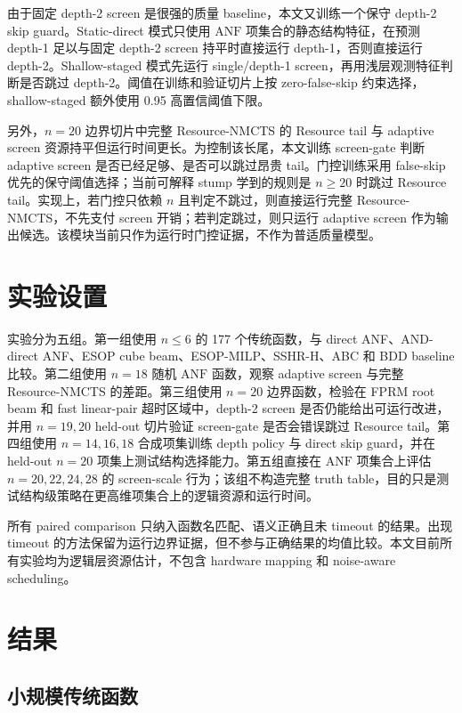 \documentclass[UTF8,fontset=macnew,11pt]{ctexart}
\newcommand{\method}{Resource-NMCTS}
\newcommand{\anf}{\ensuremath{\mathrm{ANF}}}
\begin{document}
由于固定 depth-2 screen 是很强的质量 baseline，本文又训练一个保守 depth-2 skip guard。Static-direct 模式只使用 \anf{} 项集合的静态结构特征，在预测 depth-1 足以与固定 depth-2 screen 持平时直接运行 depth-1，否则直接运行 depth-2。Shallow-staged 模式先运行 single/depth-1 screen，再用浅层观测特征判断是否跳过 depth-2。阈值在训练和验证切片上按 zero-false-skip 约束选择，shallow-staged 额外使用 0.95 高置信阈值下限。

另外，$n=20$ 边界切片中完整 \method{} 的 Resource tail 与 adaptive screen 资源持平但运行时间更长。为控制该长尾，本文训练 screen-gate 判断 adaptive screen 是否已经足够、是否可以跳过昂贵 tail。门控训练采用 false-skip 优先的保守阈值选择；当前可解释 stump 学到的规则是 $n\geq20$ 时跳过 Resource tail。实现上，若门控只依赖 $n$ 且判定不跳过，则直接运行完整 \method{}，不先支付 screen 开销；若判定跳过，则只运行 adaptive screen 作为输出候选。该模块当前只作为运行时门控证据，不作为普适质量模型。

\section{实验设置}

实验分为五组。第一组使用 $n\leq6$ 的 177 个传统函数，与 direct ANF、AND-direct ANF、ESOP cube beam、ESOP-MILP、SSHR-H、ABC 和 BDD baseline 比较。第二组使用 $n=18$ 随机 \anf{} 函数，观察 adaptive screen 与完整 \method{} 的差距。第三组使用 $n=20$ 边界函数，检验在 FPRM root beam 和 fast linear-pair 超时区域中，depth-2 screen 是否仍能给出可运行改进，并用 $n=19,20$ held-out 切片验证 screen-gate 是否会错误跳过 Resource tail。第四组使用 $n=14,16,18$ 合成项集训练 depth policy 与 direct skip guard，并在 held-out $n=20$ 项集上测试结构选择能力。第五组直接在 \anf{} 项集合上评估 $n=20,22,24,28$ 的 screen-scale 行为；该组不构造完整 truth table，目的只是测试结构级策略在更高维项集合上的逻辑资源和运行时间。

所有 paired comparison 只纳入函数名匹配、语义正确且未 timeout 的结果。出现 timeout 的方法保留为运行边界证据，但不参与正确结果的均值比较。本文目前所有实验均为逻辑层资源估计，不包含 hardware mapping 和 noise-aware scheduling。

\section{结果}

\subsection{小规模传统函数}
\end{document}
